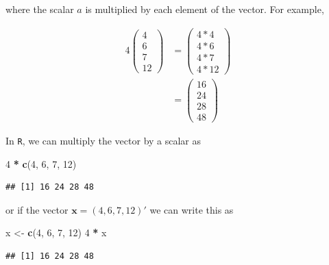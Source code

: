 \documentclass[
]{book}
\newenvironment{Shaded}{\begin{snugshade}}{\end{snugshade}}
\newcommand{\DecValTok}[1]{\textcolor[rgb]{0.00,0.00,0.81}{#1}}
\newcommand{\KeywordTok}[1]{\textcolor[rgb]{0.13,0.29,0.53}{\textbf{#1}}}
\newcommand{\NormalTok}[1]{#1}
\newcommand{\OperatorTok}[1]{\textcolor[rgb]{0.81,0.36,0.00}{\textbf{#1}}}
\newcommand{\StringTok}[1]{\textcolor[rgb]{0.31,0.60,0.02}{#1}}
\theoremstyle{definition}
\theoremstyle{definition}
\theoremstyle{definition}
\theoremstyle{definition}
\theoremstyle{remark}
\begin{document}
where the scalar \(a\) is multiplied by each element of the vector. For example,

\[
\begin{aligned}
4 \begin{pmatrix} 4 \\ 6 \\ 7 \\ 12 \end{pmatrix} 
& = \begin{pmatrix} 4 * 4 \\ 4 * 6 \\ 4 * 7 \\ 4 * 12 \end{pmatrix} \\
& = \begin{pmatrix} 16 \\ 24 \\ 28 \\ 48 \end{pmatrix} 
\end{aligned}
\]

In \texttt{R}, we can multiply the vector by a scalar as

\begin{Shaded}
\begin{Highlighting}[]
\DecValTok{4} \OperatorTok{*}\StringTok{ }\KeywordTok{c}\NormalTok{(}\DecValTok{4}\NormalTok{, }\DecValTok{6}\NormalTok{, }\DecValTok{7}\NormalTok{, }\DecValTok{12}\NormalTok{)}
\end{Highlighting}
\end{Shaded}

\begin{verbatim}
## [1] 16 24 28 48
\end{verbatim}

or if the vector \(\mathbf{x} = \left( 4, 6, 7, 12 \right)'\) we can write this as

\begin{Shaded}
\begin{Highlighting}[]
\NormalTok{x <-}\StringTok{ }\KeywordTok{c}\NormalTok{(}\DecValTok{4}\NormalTok{, }\DecValTok{6}\NormalTok{, }\DecValTok{7}\NormalTok{, }\DecValTok{12}\NormalTok{)}
\DecValTok{4} \OperatorTok{*}\StringTok{ }\NormalTok{x}
\end{Highlighting}
\end{Shaded}

\begin{verbatim}
## [1] 16 24 28 48
\end{verbatim}
\end{document}

